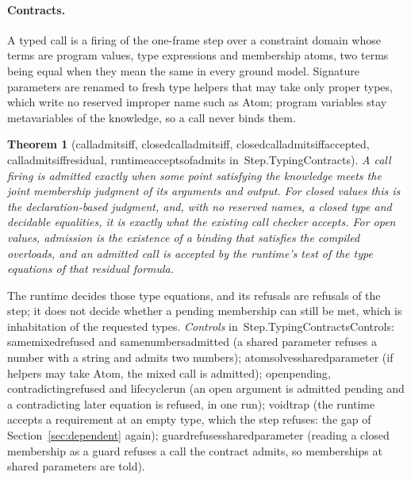 \documentclass[11pt]{article}
\newtheorem{theorem}{Theorem}
\theoremstyle{remark}
\newcommand{\lean}[1]{{\ttfamily\def\_{\textunderscore\allowbreak}#1}}
\newcommand{\inmod}[1]{in~{\ttfamily\def\_{\textunderscore\allowbreak}#1}}
\begin{document}
\paragraph{Contracts.} A typed call is a firing of the one-frame step over a constraint domain whose
terms are program values, type expressions and membership atoms, two terms being equal when they mean
the same in every ground model. Signature parameters are renamed to fresh type helpers that may take
only proper types, which write no reserved improper name such as \lean{Atom}; program variables stay
metavariables of the knowledge, so a call never binds them.

\begin{theorem}[\lean{call\_admits\_iff}, \lean{closed\_call\_admits\_iff}, \lean{closed\_call\_admits\_iff\_accepted}, \lean{call\_admits\_iff\_residual}, \lean{runtime\_accepts\_of\_admits} \inmod{Step.TypingContracts}]
A call firing is admitted exactly when some point satisfying the knowledge meets the joint membership
judgment of its arguments and output. For closed values this is the declaration-based judgment, and,
with no reserved names, a closed type and decidable equalities, it is exactly what the existing call
checker accepts. For open values, admission is the existence of a binding that satisfies the
compiled overloads, and an admitted call is accepted by the runtime's test of the type equations of
that residual formula.
\end{theorem}

The runtime decides those type equations, and its refusals are refusals of the step; it does not
decide whether a pending membership can still be met, which is inhabitation of the requested types.
\emph{Controls} \inmod{Step.TypingContractsControls}: \lean{same\_mixed\_refused} and \lean{same\_numbers\_admitted}
(a shared parameter refuses a number with a string and admits two numbers);
\lean{atom\_solves\_shared\_parameter} (if helpers may take \lean{Atom}, the mixed call is admitted);
\lean{open\_pending}, \lean{contradicting\_refused} and \lean{lifecycle\_run} (an open argument is admitted
pending and a contradicting later equation is refused, in one run); \lean{void\_trap} (the runtime
accepts a requirement at an empty type, which the step refuses: the gap of
Section~\ref{sec:dependent} again); \lean{guard\_refuses\_shared\_parameter} (reading a closed membership as
a guard refuses a call the contract admits, so memberships at shared parameters are told).
\end{document}
